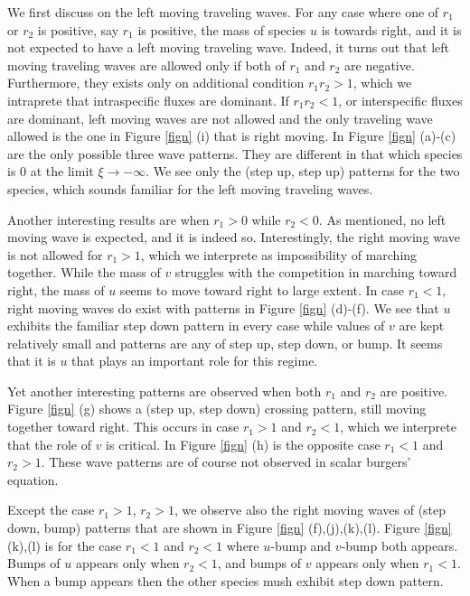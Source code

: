 \documentclass{amsart}
\theoremstyle{definition}
\numberwithin{equation}{section}
\begin{document}
We first discuss on the left moving traveling waves. For any case where one of $r_1$ or $r_2$ is positive, say $r_1$ is positive, the mass of species $u$ is towards right, and it is not expected to have a left moving traveling wave. Indeed, it turns out that left moving traveling waves are allowed only if both of $r_1$ and $r_2$ are negative. Furthermore, they exists only on additional condition $r_1r_2>1$, which we intraprete that intraspecific fluxes are dominant. If $r_1r_2<1$, or interspecific fluxes are dominant, left moving waves are not allowed and the only traveling wave allowed is the one in Figure \ref{fign} (i) that is right moving. In Figure \ref{fign} (a)-(c) are the only possible three wave patterns. They are different in that which species is $0$ at the limit $\xi \rightarrow -\infty$. We see only the (step up, step up) patterns for the two species, which sounds familiar for the left moving traveling waves.

Another interesting results are when $r_1>0$ while $r_2<0$. As mentioned, no left moving wave is expected, and it is indeed so. Interestingly, the right moving wave is not allowed for $r_1>1$, which we interprete as impossibility of marching together. While the mass of $v$ struggles with the competition in marching toward right, the mass of $u$ seems to move toward right to large extent. In case $r_1<1$, right moving waves do exist with patterns in Figure \ref{fign} (d)-(f). We see that $u$ exhibits the familiar step down pattern in every case while values of $v$ are kept relatively small and patterns are any of step up, step down, or bump. It seems that it is $u$ that plays an important role for this regime.

Yet another interesting patterns are observed when both $r_1$ and $r_2$ are positive. Figure \ref{fign} (g) shows a (step up, step down) crossing pattern, still moving together toward right. This occurs in case $r_1>1$ and $r_2<1$, which we interprete that the role of $v$ is critical. In Figure \ref{fign} (h) is the opposite case $r_1<1$ and $r_2>1$. These wave patterns are of course not observed in scalar burgers' equation.

Except the case $r_1>1$, $r_2>1$, we observe also the right moving waves of (step down, bump) patterns that are shown in Figure \ref{fign} (f),(j),(k),(l). Figure \ref{fign} (k),(l) is for the case $r_1<1$ and $r_2 <1$ where $u$-bump and $v$-bump both appears. Bumps of $u$ appears only when $r_2<1$, and bumps of $v$ appears only when $r_1<1$. When a bump appears then the other species mush exhibit step down pattern.
\end{document}
